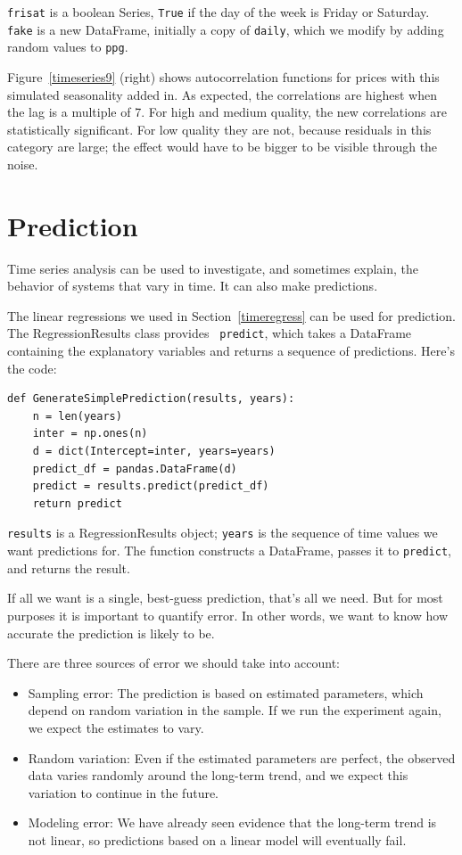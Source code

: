 \documentclass[12pt]{book}
\begin{document}
{\tt frisat} is a boolean Series, {\tt True} if the day of the
week is Friday or Saturday.  {\tt fake} is a new DataFrame, initially
a copy of {\tt daily}, which we modify by adding random values
to {\tt ppg}.

Figure~\ref{timeseries9} (right) shows autocorrelation functions for
prices with this simulated seasonality added in.  As expected, the
correlations are highest when the lag is a multiple of 7.  For
high and medium quality, the new correlations are statistically
significant.  For low quality they are not, because residuals in this
category are large; the effect would have to be bigger
to be visible through the noise.


\section{Prediction}  

Time series analysis can be used to investigate, and sometimes
explain, the behavior of systems that vary in time.  It can also
make predictions.

The linear regressions we used in Section~\ref{timeregress} can be
used for prediction.  The RegressionResults class provides {\tt
  predict}, which takes a DataFrame containing the explanatory
variables and returns a sequence of predictions.  Here's the code:

\begin{verbatim}
def GenerateSimplePrediction(results, years):
    n = len(years)
    inter = np.ones(n)
    d = dict(Intercept=inter, years=years)
    predict_df = pandas.DataFrame(d)
    predict = results.predict(predict_df)
    return predict
\end{verbatim}

{\tt results} is a RegressionResults object; {\tt years} is the
sequence of time values we want predictions for.  The function
constructs a DataFrame, passes it to {\tt predict}, and
returns the result.

If all we want is a single, best-guess prediction, that's all
we need.  But for most purposes it is important to quantify error.
In other words, we want to know how accurate the prediction is likely
to be.

There are three sources of error we should take into account:

\begin{itemize}

\item Sampling error: The prediction is based on estimated
parameters, which depend on random variation
in the sample.  If we run the experiment again, we expect
the estimates to vary.

\item Random variation:  Even if the estimated parameters are
perfect, the observed data varies randomly around the long-term
trend, and we expect this variation to continue in the future.

\item Modeling error: We have already seen evidence that the long-term
trend is not linear, so predictions based on a linear model will
eventually fail.  

\end{itemize}
\end{document}
